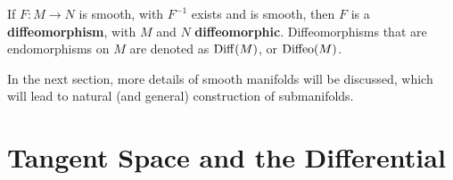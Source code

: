 \documentclass{article}
\begin{document}
\begin{definition}
    If $F: M \to N$ is smooth, with $F^{-1}$ exists and is smooth, then $F$ is a \textbf{diffeomorphism}, with $M$ and $N$ \textbf{diffeomorphic}. Diffeomorphisms that are endomorphisms on $M$ are denoted as $\mathrm{Diff}(M)$, or $\mathrm{Diffeo}(M)$.
\end{definition}

In the next section, more details of smooth manifolds will be discussed, which will lead to natural (and general) construction of submanifolds.

\section{Tangent Space and the Differential}
\end{document}
